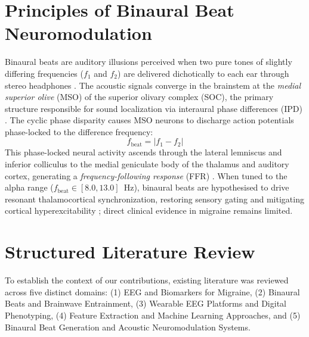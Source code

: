 \documentclass[12pt, a4paper]{report}
\begin{document}
\section{Principles of Binaural Beat Neuromodulation}
\label{sec:binaural_principles}
Binaural beats are auditory illusions perceived when two pure tones of slightly differing frequencies ($f_1$ and $f_2$) are delivered dichotically to each ear through stereo headphones \cite{Oster1973}. The acoustic signals converge in the brainstem at the \textit{medial superior olive} (MSO) of the superior olivary complex (SOC), the primary structure responsible for sound localization via interaural phase differences (IPD) \cite{Wahbeh2007}. The cyclic phase disparity causes MSO neurons to discharge action potentials phase-locked to the difference frequency:
\begin{equation}
    f_{\text{beat}} = |f_1 - f_2|
    \label{eq:binaural_beat_freq}
\end{equation}
This phase-locked neural activity ascends through the lateral lemniscus and inferior colliculus to the medial geniculate body of the thalamus and auditory cortex, generating a \textit{frequency-following response} (FFR) \cite{Ingendoh2023,Shamsi2024}. When tuned to the alpha range ($f_{\text{beat}} \in [8.0, 13.0]$~Hz), binaural beats are hypothesised to drive resonant thalamocortical synchronization, restoring sensory gating and mitigating cortical hyperexcitability \cite{CoronaGonzalez2021,Melnichuk2025,magalhaes2025auditory}; direct clinical evidence in migraine remains limited.

\section{Structured Literature Review}
\label{sec:literature_review}
To establish the context of our contributions, existing literature was reviewed across five distinct domains: (1) EEG and Biomarkers for Migraine, (2) Binaural Beats and Brainwave Entrainment, (3) Wearable EEG Platforms and Digital Phenotyping, (4) Feature Extraction and Machine Learning Approaches, and (5) Binaural Beat Generation and Acoustic Neuromodulation Systems.
\end{document}
